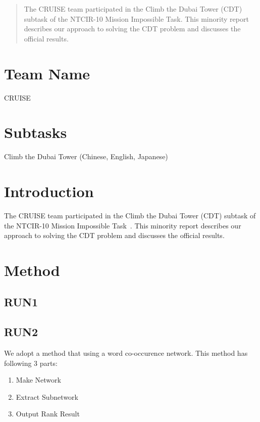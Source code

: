 \documentclass{sig-alternate}
\begin{document}
\begin{abstract}
The CRUISE team participated in the Climb the Dubai Tower (CDT) subtask of the NTCIR-10 Mission Impossible Task.
This minority report describes our approach to solving the CDT problem and discusses the official results.
\end{abstract}

\section*{Team Name}
CRUISE

\section*{Subtasks}
Climb the Dubai Tower (Chinese, English, Japanese)


\section{Introduction}

The CRUISE team participated in the Climb the Dubai Tower (CDT) subtask of the NTCIR-10 Mission Impossible Task~\cite{mioverview}.
This minority report describes our approach to solving the CDT problem and discusses the official results.

\section{Method}
\subsection{RUN1}
\subsection{RUN2}
We adopt a method that using a word co-occurence network.
This method has following 3 parts:
\begin{enumerate}
    \item Make Network
    \item Extract Subnetwork
    \item Output Rank Result
\end{enumerate} 
\end{document}
